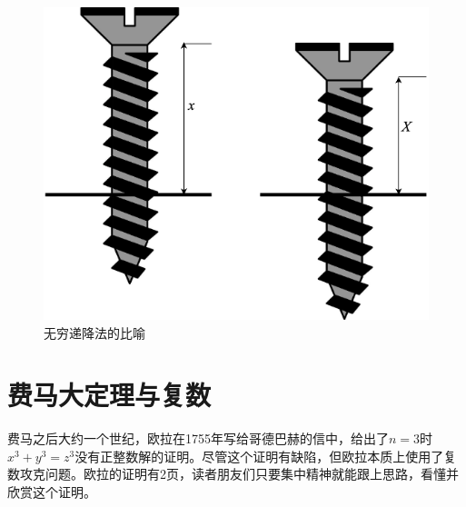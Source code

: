 \documentclass[b5paper]{ctexart}
\begin{document}
\begin{figure}[htbp]
 \centering
 \includegraphics[scale=0.3]{img/infinite-descent}
 \caption{无穷递降法的比喻}
 \label{fig:infinite-descent}
\end{figure}

\section{费马大定理与复数}

费马之后大约一个世纪，欧拉在1755年写给哥德巴赫的信中，给出了$n = 3$时$x^3 + y^3 = z^3$没有正整数解的证明。尽管这个证明有缺陷，但欧拉本质上使用了复数攻克问题。欧拉的证明有2页，读者朋友们只要集中精神就能跟上思路，看懂并欣赏这个证明。
\end{document}
